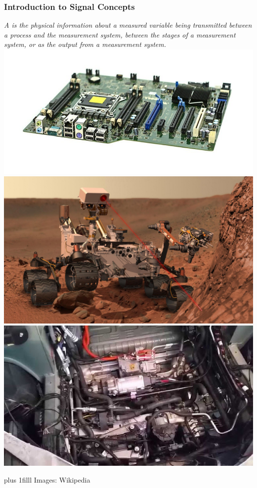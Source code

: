 \documentclass[fleqn]{beamer} %
\newcommand{\sectionIsubsectionItitle}{Introduction to Signal Concepts}
\newcommand{\btVFill}{\vskip0pt plus 1filll}
\newcommand{\uhspc}{\underline{\hspace{20 mm}}}
\begin{document}
			\begin{frame}
				\frametitle{\sectionIsubsectionItitle}

						\bigskip
		
		{\it A {\PR \uhspc} is the physical information about a measured variable being transmitted
		between a process and the measurement system, between the stages of a measurement system, or as
		the output from a measurement system. } \\
	
		\includegraphics[scale=.07]{images/computer_motherboard.jpg} 
		\includegraphics[scale=.06]{images/curiosity_on_mars.jpg} 
		\includegraphics[scale=.22]{images/tesla_underhood.jpg}
		
		\btVFill
		\tiny{Images: Wikipedia}	

		

			\end{frame}
\end{document}
